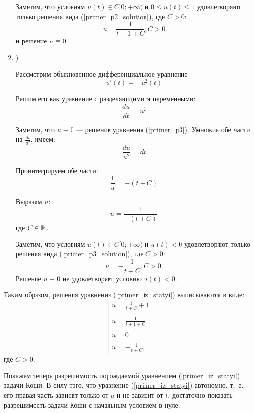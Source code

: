 \begin{enumerate}
Заметим, что условиям $u(t) \in C[0; +\infty)$ и $0 \leq u(t) \leq 1$ удовлетворяют только решения вида (\ref{primer_p2_solution}), где $C>0$:
\begin{equation}
	u=\frac{1}{t+1+C}, C>0
\end{equation}
и решение $u \equiv 0$.




\item)

Рассмотрим обыкновенное дифференциальное уравнение
\begin{equation}\label{primer_p3}
	u'(t)=-u^2(t)
\end{equation}

Решим его как уравнение с разделяющимися переменными:
$$
	\frac{du}{dt}=u^2
$$

Заметим, что $u\equiv 0$ --- решение уравнения (\ref{primer_p3}).
Умножив обе части на $\frac{dt}{u^2}$, имеем:
$$
	\frac{du}{u^2}=dt
$$

Проинтегрируем обе части:
$$
	\frac{1}{u}=-(t+C)
$$

Выразим $u$:
\begin{equation}\label{primer_p3_solution}
	u=\frac{1}{-(t+C)}
\end{equation}
где $C\in\mathbb{R}$.

Заметим, что условиям $u(t) \in C[0; +\infty)$ и $u(t) < 0$ удовлетворяют только решения вида (\ref{primer_p3_solution}), где $C>0$:
\begin{equation}
	u=-\frac{1}{t+C}, C>0.
\end{equation}
Решение $u \equiv 0$ не удовлетворяет условию $u(t)<0$.

\end{enumerate}

Таким образом, решения уравнения (\ref{primer_iz_statyi}) выписываются в виде:
\begin{equation}\label{primer_iz_statyi_u_t}
	\left[
		\begin{array}{l}
			u=\frac{1}{t+C}+1
		\\\\
			u=\frac{1}{t+1+C}
		\\\\
			u=0
		\\\\
			u=-\frac{1}{t+C},
		\end{array}
	\right.
\end{equation}
где $C>0$.

Покажем теперь разрешимость порождаемой уравнением (\ref{primer_iz_statyi}) задачи Коши.
В силу того, что уравнение (\ref{primer_iz_statyi}) автономно, т.~е. его правая часть зависит только от $u$ и не зависит от $t$,
достаточно показать разрешимость задачи Коши с начальным условием в нуле.

